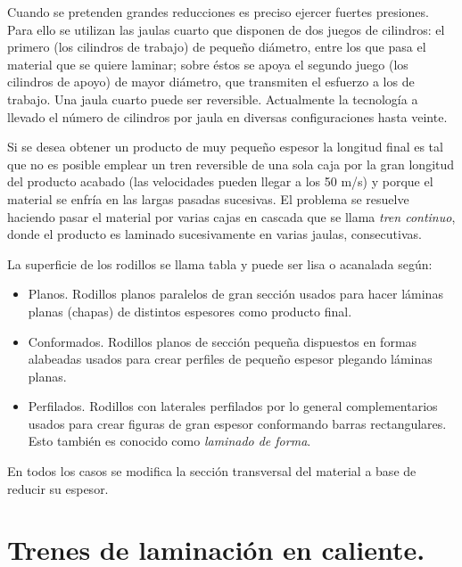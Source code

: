 Cuando se pretenden grandes reducciones es preciso ejercer fuertes presiones. Para ello se utilizan las jaulas cuarto que disponen de dos juegos de cilindros: el primero (los cilindros de trabajo) de pequeño diámetro, entre los que pasa el material que se quiere laminar; sobre éstos se apoya el segundo juego (los cilindros de apoyo) de mayor diámetro, que transmiten el esfuerzo a los de trabajo. Una jaula cuarto puede ser reversible. Actualmente la tecnología a llevado el número de cilindros por jaula en diversas configuraciones hasta veinte.

Si se desea obtener un producto de muy pequeño espesor la longitud final es tal que no es posible emplear un tren reversible de una sola caja por la gran longitud del producto acabado (las velocidades pueden llegar  a los 50 m/s) y porque el material se enfría en las largas pasadas sucesivas. El problema se resuelve haciendo pasar el material por varias cajas en cascada que se llama \emph{tren continuo}, donde el producto es laminado sucesivamente en varias jaulas, consecutivas.

La superficie de los rodillos se llama tabla y puede ser lisa o acanalada según:

\begin{itemize}
	\item Planos. Rodillos planos paralelos de gran sección usados para hacer láminas planas (chapas) de distintos espesores como producto final.
	\item Conformados. Rodillos planos de sección pequeña dispuestos en formas alabeadas usados para crear perfiles de pequeño espesor plegando láminas planas.
	\item Perfilados. Rodillos con laterales perfilados por lo general complementarios usados para crear figuras de gran espesor conformando barras rectangulares. Esto también es conocido como \emph{laminado de forma}.
\end{itemize}

En todos los casos se modifica la sección transversal del material a base de reducir su espesor.



\section{Trenes de laminación en caliente.}

